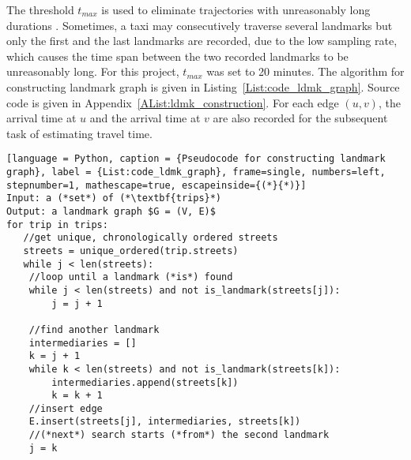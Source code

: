 The threshold $t_{max}$ is used to eliminate trajectories with unreasonably long du\-rations \cite{TDR10}. Sometimes, a taxi may consecutively traverse several landmarks but only the first and the last landmarks are recorded, due to the low sampling rate, which causes the time span between the two recorded landmarks to be unreasonably long. For this project, $t_{max}$ was set to 20 minutes. The algorithm for constructing landmark graph is given in Listing~\ref{List:code_ldmk_graph}. Source code is given in Appendix~\ref{AList:ldmk_construction}. For each edge $(u, v)$, the arrival time at $u$ and the arrival time at $v$ are also recorded for the subsequent task of estimating travel time. 

\begin{lstlisting}[language = Python, caption = {Pseudocode for constructing landmark graph}, label = {List:code_ldmk_graph}, frame=single, numbers=left, stepnumber=1, mathescape=true, escapeinside={(*}{*)}]
Input: a (*set*) of (*\textbf{trips}*)
Output: a landmark graph $G = (V, E)$
for trip in trips:
   //get unique, chronologically ordered streets
   streets = unique_ordered(trip.streets)
   while j < len(streets):
	//loop until a landmark (*is*) found
	while j < len(streets) and not is_landmark(streets[j]):
	    j = j + 1
		
	//find another landmark
	intermediaries = []
	k = j + 1
	while k < len(streets) and not is_landmark(streets[k]):
	    intermediaries.append(streets[k])
	    k = k + 1
	//insert edge
	E.insert(streets[j], intermediaries, streets[k])
	//(*next*) search starts (*from*) the second landmark
	j = k
\end{lstlisting}
